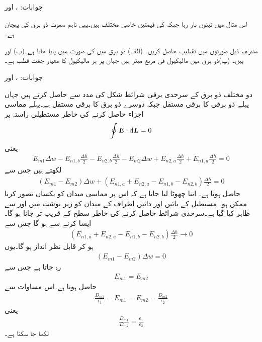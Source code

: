 جوابات: ،  اور 

اس مثال میں تینوں بار  رہا جبکہ  کی قیمتیں خاصی مختلف ہیں۔یہی ناہم سموت ذو برق کی پہچان ہے۔
 
مندرجہ ذیل صورتوں میں تقطیب حاصل کریں۔ (الف) ذو برق میں  کی صورت میں  پایا جاتا ہے۔(ب)  اور  ہیں۔ (پ)ذو برق میں   مالیکیول فی مربع میٹر ہیں جہاں  پر  ہر مالیکیول کا معیار جفت قطب
  ہے۔ 

جوابات: ،  اور 

دو مختلف ذو برق کے سرحدی برقی شرائط شکل  کی مدد سے حاصل کرتے ہیں جہاں پہلے ذو برقی کا برقی مستقل  جبکہ دوسرے ذو برق کا برقی مستقل  ہے۔پہلے مماسی اجزاء حاصل کرنے کی خاطر مستطیلی راستہ  پر
\begin{align*}
\oint \kvec{E} \cdot \dif \kvec{L}=0
\end{align*}
یعنی
\begin{align*}
E_{m1} \Delta w-E_{n1,b}\frac{\Delta h}{2}-E_{n2,b} \frac{\Delta h}{2}-E_{m2}\Delta w+E_{n2,a}\frac{\Delta h}{2}+E_{n1,a} \frac{\Delta h}{2}=0 
\end{align*} 
لکھتے ہیں جس سے
\begin{align*}
(E_{m1} -E_{m2})\Delta w +(E_{n1,a}+E_{n2,a}-E_{n1,b}-E_{n2,b})\frac{\Delta h}{2}=0
\end{align*} 
حاصل ہوتا ہے۔ اتنا چھوٹا لیا جاتا ہے کہ اس پر مماسی میدان کو یکساں تصور کرنا ممکن ہو۔ مستطیل کے بائیں اور دائیں اطراف کے میدان کو زیر نوشت میں  اور  سے ظاہر کیا گیا ہے۔سرحدی شرائط حاصل کرنے کی خاطر سطح کے قریب تر جانا ہو گا۔ایسا کرنے سے  ہو گا جس سے
\begin{align*}
(E_{n1,a}+E_{n2,a}-E_{n1,b}-E_{n2,b})\frac{\Delta h}{2} \to 0
\end{align*} 
ہو کر قابل نظر انداز ہو گا۔یوں
\begin{align*}
(E_{m1} -E_{m2})\Delta w =0
\end{align*} 
رہ جاتا ہے جس سے 
\begin{align}\label{مساوات_کپیسٹر_دو_ذو_برق_سرحدی_شرائط_الف}
E_{m1} =E_{m2}
\end{align} 
حاصل ہوتا ہے۔اس مساوات سے
\begin{align*}
\frac{D_{m1}}{\epsilon_1}=E_{m1}=E_{m2}=\frac{D_{m2}}{\epsilon_2}
\end{align*}
یعنی
\begin{align}\label{مساوات_کپیسٹر_دو_ذو_برق_سرحدی_شرائط_ب}
\frac{D_{m1}}{D_{m2}}=\frac{\epsilon_1}{\epsilon_2}
\end{align}
لکھا جا سکتا ہے۔

